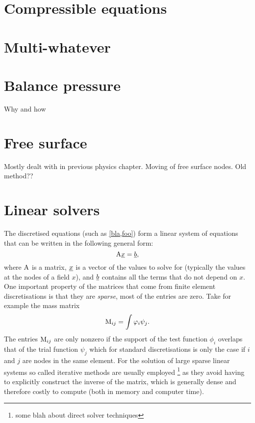 \section{Compressible equations}

\section{Multi-whatever}

\section{Balance pressure}
Why and how

\section{Free surface}
Mostly dealt with in previous physics chapter.
Moving of free surface nodes.
Old method??

\section{Linear solvers} \label{ND_Linear_solvers}
The discretised equations (such as \eqref{bla,foo}) form 
a linear system of equations that can be written 
in the following general form:
\begin{equation*}
  \mathrm{A}\underline{x}=\underline{b},
\end{equation*}
where $\mathrm{A}$ is a matrix, $\underline{x}$ is a vector of the values 
to solve for (typically the values at the nodes of a field $x$), 
and $\underline{b}$ contains all the terms that do not depend on 
$x$. One important property of the matrices that come from 
finite element discretisations is that they are \emph{sparse}, 
\ie most of the entries are zero. Take for example the mass matrix
\begin{equation*}
  \mathrm{M}_{ij}=\int \varphi_i \psi_j.
\end{equation*}
The entries $\mathrm{M}_{ij}$ are only nonzero if the support of the 
test function $\phi_i$ overlaps that of the trial function 
$\psi_j$ which for standard \PN discretisations is only the case if
$i$ and $j$ are nodes in the same element. For the solution of large
sparse linear systems so called iterative methods are usually employed
\footnote{some blah about direct solver techniques} as they 
avoid having to explicitly construct the inverse of the matrix, 
which is generally dense and therefore costly to compute 
(both in memory and computer time).

